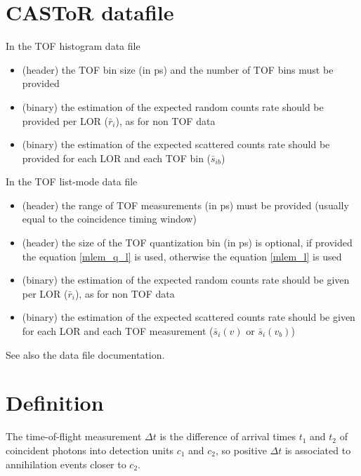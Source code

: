 \documentclass[a4paper, 11pt]{article}
\begin{document}
\section{CASToR datafile}

In the TOF histogram data file
\begin{itemize}
\item (header) the TOF bin size (in ps) and the number of TOF bins must be provided
\item (binary) the estimation of the expected random counts rate should be provided per LOR ($\bar{r}_i$), as for non TOF data
\item (binary) the estimation of the expected scattered counts rate should be provided for each LOR and each TOF bin ($\bar{s}_{ib}$)
\end{itemize}

In the TOF list-mode data file
\begin{itemize}
\item (header) the range of TOF measurements (in ps) must be provided (usually equal to the coincidence timing window)
\item (header) the size of the TOF quantization bin (in ps) is optional, if provided the equation \ref{mlem_q_l} is used, otherwise the equation \ref{mlem_l} is used
\item (binary) the estimation of the expected random counts rate should be given per LOR ($\bar{r}_i$), as for non TOF data
\item (binary) the estimation of the expected scattered counts rate should be given for each LOR and each TOF measurement ($\bar{s}_{i}(v)$ or  $\bar{s}_{i}(v_b)$)
\end{itemize}

See also the data file documentation.

\section{Definition}

The time-of-flight measurement $\Delta t$ is the difference of arrival times $t_1$ and $t_2$ of coincident photons into detection units $c_1$ and $c_2$, so positive $\Delta t$ is associated to annihilation events closer to $c_2$.
\end{document}
